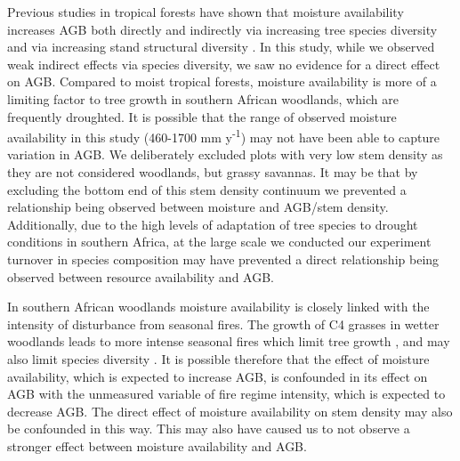 \documentclass[11pt,a4paper]{article}
\begin{document}
Previous studies in tropical forests have shown that moisture availability increases AGB both directly and indirectly via increasing tree species diversity and via increasing stand structural diversity \citep{Ali2019a, Ali2019b, Poorter2017}. In this study, while we observed weak indirect effects via species diversity, we saw no evidence for a direct effect on AGB. Compared to moist tropical forests, moisture availability is more of a limiting factor to tree growth in southern African woodlands, which are frequently droughted. It is possible that the range of observed moisture availability in this study (\textapprox{}460-1700 mm y\textsuperscript{-1}) may not have been able to capture variation in AGB. We deliberately excluded plots with very low stem density as they are not considered woodlands, but grassy savannas. It may be that by excluding the bottom end of this stem density continuum we prevented a relationship being observed between moisture and AGB/stem density. Additionally, due to the high levels of adaptation of tree species to drought conditions in southern Africa, at the large scale we conducted our experiment turnover in species composition may have prevented a direct relationship being observed between resource availability and AGB.

In southern African woodlands moisture availability is closely linked with the intensity of disturbance from seasonal fires. The growth of C4 grasses in wetter woodlands leads to more intense seasonal fires which limit tree growth \citep{Charles-Dominique2018}, and may also limit species diversity \citep{Linder2014}. It is possible therefore that the effect of moisture availability, which is expected to increase AGB, is confounded in its effect on AGB with the unmeasured variable of fire regime intensity, which is expected to decrease AGB. The direct effect of moisture availability on stem density may also be confounded in this way. This may also have caused us to not observe a stronger effect between moisture availability and AGB.

\end{document}
